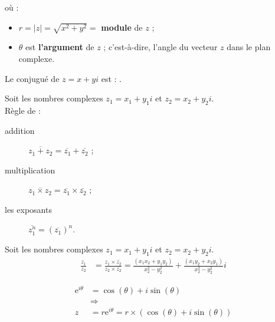 \documentclass[10pt, french]{article}
\begin{document}
\begin{multicols*}{2}
\begin{definitionNOHFILLprop}
 où : 
\begin{itemize}
	\item	$r	=	|z|	=	\sqrt{x^{2} + y^{2}}	=$ \textbf{module} de $z$ ;
	\item	$\theta$	est \textbf{l'argument} de $z$ ; c'est-à-dire, l'angle du vecteur $z$ dans le plan complexe.
\end{itemize}
\end{definitionNOHFILLprop}

\begin{definitionNOHFILLprop}
Le conjugué de $z	=	x + yi$ est : .

\begin{definitionNOHFILLpropos}
Soit les nombres complexes $z_{1}	=	x_{1} + y_{1}i$ et $z_{2}	=	x_{2} + y_{2}i$.\\
Règle de : 
\begin{description}
	\item[addition]	$\overline{z_{1} + z_{2}}	=	\overline{z_{1}} + \overline{z_{2}}$ ;
	\item[multiplication]	$\overline{z_{1} \times z_{2}}	=	\overline{z_{1}} \times \overline{z_{2}}$ ;
	\item[les exposants]		$\overline{z_{1}^{n}}	=	\left(\overline{z_{1}}\right)^{n}$.
\end{description}
\end{definitionNOHFILLpropos}
\end{definitionNOHFILLprop}


\begin{definitionNOHFILLpropos}
Soit les nombres complexes $z_{1}	=	x_{1} + y_{1}i$ et $z_{2}	=	x_{2} + y_{2}i$.\\
\begin{align*}
	\frac{z_{1}}{z_{2}}
	&=	\frac{z_{1} \times \overline{z_{2}}}{z_{2} \times \overline{z_{2}}}
	=	\frac{(x_{1}x_{2} + y_{1}y_{2})}{x_{2}^{2} - y_{2}^{2}} + \frac{(x_{1}y_{2} + x_{2}y_{1})}{x_{2}^{2} - y_{2}^{2}}i
\end{align*}
\end{definitionNOHFILLpropos}

\begin{definitionNOHFILLprop}
\begin{align*}
	\textrm{e}^{i\theta}
	&=	\cos(\theta) + i\sin(\theta)	\\
	&\Rightarrow	\\
	z
	&=	r\textrm{e}^{i\theta}
	=	r\times\left(\cos(\theta) + i\sin(\theta)\right)
\end{align*}
\end{definitionNOHFILLprop}


\end{multicols*}
\end{document}
